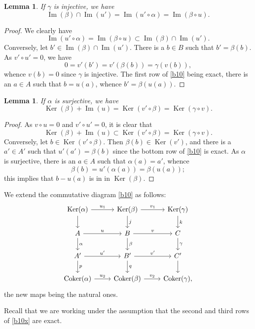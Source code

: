 \documentclass[parskip=half,fontsize=12pt]{scrartcl}%
\newcommand{\oo}{\operatorname}\newcommand{\ooo}{\operatorname*}
\newtheorem{lem}[thm]{Lemma}
\begin{document}
\begin{lem}\label{b1i}
If $\gamma$ is injective, we have 
$$
\oo{Im}(\beta)\cap\oo{Im}(u')=\oo{Im}(u'\circ\alpha)=\oo{Im}(\beta\circ u).
$$
\end{lem}

\begin{proof}
We clearly have 
$$
\oo{Im}(u'\circ\alpha)=\oo{Im}(\beta\circ u)\subset\oo{Im}(\beta)\cap\oo{Im}(u').
$$ 
Conversely, let $b'\in\oo{Im}(\beta)\cap\oo{Im}(u')$. There is a $b\in B$ such that $b'=\beta(b)$. As $v'\circ u'=0$, we have 
$$
0=v'(b')=v'(\beta(b))=\gamma(v(b)),
$$ 
whence $v(b)=0$ since $\gamma$ is injective. The first row of \eqref{b10} being exact, there is an $a\in A$ such that $b=u(a)$, whence $b'=\beta(u(a))$.
\end{proof}

\begin{lem}\label{b1ii}
If $\alpha$ is surjective, we have 
$$
\oo{Ker}(\beta)+\oo{Im}(u)=\oo{Ker}(v'\circ\beta)=\oo{Ker}(\gamma\circ v).
$$
\end{lem}

\begin{proof}
As $v\circ u=0$ and $v'\circ u'=0$, it is clear that 
$$
\oo{Ker}(\beta)+\oo{Im}(u)\subset\oo{Ker}(v'\circ\beta)=\oo{Ker}(\gamma\circ v).
$$ 
Conversely, let $b\in\oo{Ker}(v'\circ\beta)$. Then $\beta(b)\in\oo{Ker}(v')$, and there is a $a'\in A'$ such that $u'(a')=\beta(b)$ since the bottom row of \eqref{b10} is exact. As $\alpha$ is surjective, there is an $a\in A$ such that $\alpha(a)=a'$, whence 
$$
\beta(b)=u'(\alpha(a))=\beta(u(a));
$$ 
this implies that $b-u(a)$ is in in $\oo{Ker}(\beta)$.
\end{proof}

We extend the commutative diagram \eqref{b10} as follows:
\begin{equation}\label{b10x}
\begin{tikzcd}
\oo{Ker}(\alpha)\ar[d]\ar[r,"u_1"]&\oo{Ker}(\beta)\ar[d,"j"]\ar[r,"v_1"]&\oo{Ker}(\gamma)\ar[d,"k"]\\ 
A\ar[d,"\alpha"]\ar[r,"u"]&B\ar[d,"\beta"]\ar[r,"v"]&C\ar[d,"\gamma"]\\ 
A'\ar[d,"p"]\ar[r,"u'"]&B'\ar[d,"q"]\ar[r,"v'"]&C'\ar[d]\\ 
\oo{Coker}(\alpha)\ar[r,"u_2"]&\oo{Coker}(\beta)\ar[r,"v_2"]&\oo{Coker}(\gamma),
\end{tikzcd}
\end{equation} 
the new maps being the natural ones.

Recall that we are working under the assumption that the second and third rows of \eqref{b10x} are exact.
\end{document}
